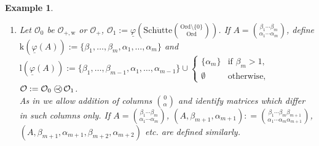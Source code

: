 \documentclass[10pt]{article}
\def \ssubitem#1{\item \label{\actlabel#1} }
\def\mycases#1{\begin{cases}#1\end{cases}}
\newtheorem {example}[lemma]{Example}
\def \calO{{\mathcal O}}
\def\k{\mathrm{k}}
\def\lrm{\mathrm{l}}
\def\phibar{{\underline{\varphi}}}
\def\schuette{\mathrm{Sch\ddot{u}tte}}
\def\wrm{\mathrm{w}}
\def\preccirc{\mathrel{\bigcirc \kern-12pt \prec}} %
\def\Ord{\mathrm{Ord}}
\begin{document}
\begin{example}
{\begin{enumerate}
and defining $\lrm(t):= \k(t)$ yields the fixed point free version
of the Veblen function.\par 
\ssubitem g Let $\calO_0$ be $\calO_{+,\wrm}$ or $\calO_+$,
$\calO_1:= \phibar(\schuette{\Ord  \setminus \{ 0 \} \choose \Ord})$.
If $A=  
{\beta_1 \cdots \beta_m \choose \alpha_1 \cdots \alpha_m}$,
define\\
$\k(\phibar(A)):= 
\{ \beta_1 ,\ldots, \beta_m,\alpha_1 ,\ldots, \alpha_m \}$ and\\
$\lrm(\phibar(A)):= 
\{ \beta_1 ,\ldots, \beta_{m-1},\alpha_1 ,\ldots, \alpha_{m-1}\} \cup 
\mycases{ \{ \alpha_m \} &\text{if $\beta_m>1$,}\\
\emptyset&\text{otherwise,}}$\\
$\calO:= \calO_0 \preccirc \calO_1$.\\
As in \cite{Schuette54} we allow addition of 
columns $0 \choose \alpha$ and
identify matrices which differ in such columns only.
If $A= 
{\beta_1 \cdots \beta_m \choose \alpha_1 \cdots \alpha_m}$,
$(A,\beta_{m+1},\alpha_{m+1}):
= {\beta_1 \cdots \beta_m \beta_{m+1} \choose 
\alpha_1 \cdots \alpha_m \alpha_{m+1}}$,\\
$(A,\beta_{m+1},\alpha_{m+1},\beta_{m+2},\alpha_{m+2})$
etc. are defined similarly.\\ 

\end{enumerate}}
\end{example}
\end{document}
